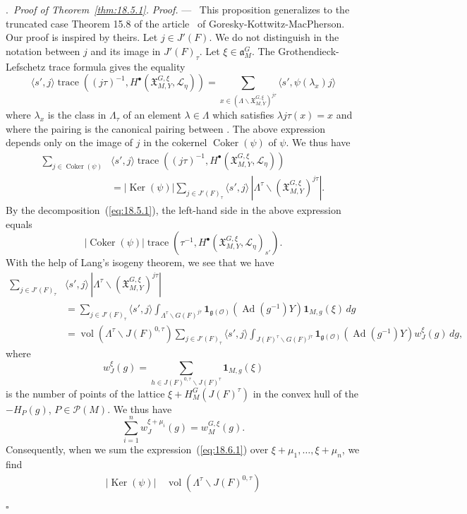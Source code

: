 \documentclass[12pt,a4paper,oneside,english,leqno]{smfart}
\makeatletter
\numberwithin{equation}{subsection}
\newcounter{theo}
\numberwithin{theo}{subsection}
\newenvironment{paragr}[1][]{\medskip\refstepcounter{subsection}%
  \par\noindent\hspace*{\parindent}\thesubsection.\ \emph{#1}%
  \@ifundefined{@empty}{}{}\ignorespaces}{\medskip}
\theoremstyle{plain}
\theoremstyle{definition}
\theoremstyle{remark}
\newenvironment{preuve}[1][]{\medskip\noindent\textit{Proof.} #1 ---\ }%
  {\hfill\ensuremath{\square}\medskip}
\DeclareMathOperator{\vol}{vol}
\DeclareMathOperator{\Ad}{Ad}
\DeclareMathOperator{\Ker}{Ker}
\DeclareMathOperator{\Coker}{Coker}
\DeclareMathOperator{\trace}{trace}
\newcommand{\oc}{\mathcal{O}}
\newcommand{\lc}{\mathcal{L}}
\newcommand{\pc}{\mathcal{P}}
\newcommand{\ggo}{\mathfrak{g}}
\newcommand{\ago}{\mathfrak{a}}
\newcommand{\Xgo}{\mathfrak{X}}
\newcommand{\la}{\lambda}
\newcommand{\back}{\backslash}
\newcommand{\bg}{\langle}
\newcommand{\bd}{\rangle}
\makeatother
\begin{document}
\begin{paragr}[Proof of Theorem~\ref{thm:18.5.1}.]
\begin{preuve}
This proposition generalizes to the truncated case Theorem 15.8 of the article~\cite{GKM} of Goresky-Kottwitz-MacPherson. Our proof is inspired by theirs. Let $j\in J'(F)$. We do not distinguish in the notation between $j$ and its image in $J'(F)_\tau$. Let $\xi\in\ago_M^G$. The Grothendieck-Lefschetz trace formula gives the equality
$$
\bg s',j\bd\trace((j\tau)^{-1},H^\bullet(\Xgo_{M,Y}^{G,\xi},\lc_\eta))= \sum_{x\in(\Lambda\back\Xgo_{M,Y}^{G,\xi})^{j\tau}}\bg s',\psi(\la_x)j\bd
$$
where $\la_x$ is the class in $\Lambda_\tau$ of an element $\la\in\Lambda$ which satisfies $\la j\tau(x)=x$ and where the pairing is the canonical pairing between . The above expression depends only on the image of $j$ in the cokernel $\Coker(\psi)$ of $\psi$. We thus have
\begin{align*}
\sum_{j\in\Coker(\psi)}&\bg s',j\bd
\trace((j\tau)^{-1},H^\bullet(\Xgo_{M,Y}^{G,\xi},\lc_\eta))\\
&=|\Ker(\psi)|\sum_{j\in J'(F)_\tau}\bg s',j\bd\,
|\Lambda^\tau\back(\Xgo_{M,Y}^{G,\xi})^{j\tau}|.
\end{align*}
By the decomposition~(\ref{eq:18.5.1}), the left-hand side in the above expression equals
\begin{equation}\label{eq:18.6.1}
|\Coker(\psi)|\trace(\tau^{-1},H^\bullet(\Xgo_{M,Y}^{G,\xi},\lc_\eta)_{s'}).
\end{equation}
With the help of Lang's isogeny theorem, we see that we have
\begin{align*}
\sum_{j\in J'(F)_\tau}&\bg s',j\bd\,
|\Lambda^\tau\back(\Xgo_{M,Y}^{G,\xi})^{j\tau}|\\
&=\sum_{j\in J'(F)_\tau}\bg s',j\bd\int_{\Lambda^\tau\back G(F)^{j\tau}}
\mathbf{1}_{\ggo(\oc)}(\Ad(g^{-1})Y)\mathbf{1}_{M,g}(\xi)\,dg\\
&=\vol(\Lambda^\tau\back J(F)^{0,\tau})\sum_{j\in J'(F)_\tau}\bg s',j\bd
\int_{J(F)^\tau\back G(F)^{j\tau}}
\mathbf{1}_{\ggo(\oc)}(\Ad(g^{-1})Y)w_J^\xi(g)\,dg,
\end{align*}
where
$$
w_J^\xi(g)=\sum_{h\in J(F)^{0,\tau}\back J(F)^\tau}\mathbf{1}_{M,g}(\xi)
$$
is the number of points of the lattice $\xi+H_M^G(J(F)^\tau)$ in the convex hull of the $-H_P(g)$, $P\in\pc(M)$. We thus have
$$
\sum_{i=1}^n w_J^{\xi+\mu_i}(g)=w_M^{G,\xi}(g).
$$
Consequently, when we sum the expression~(\ref{eq:18.6.1}) over $\xi+\mu_1,\ldots,\xi+\mu_n$, we find
\begin{equation}\label{eq:18.6.2}
\begin{split}
|\Ker(\psi)|\,&\vol(\Lambda^\tau\back J(F)^{0,\tau})\\

\end{split}
\end{equation}
\end{preuve}
\end{paragr}
\end{document}
